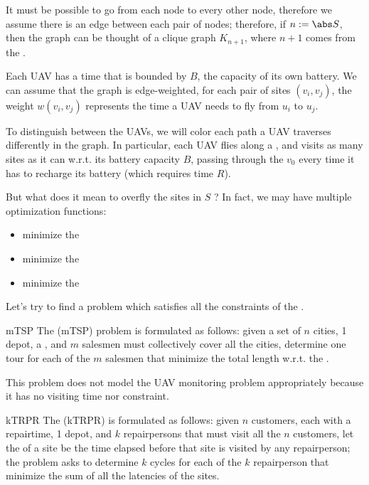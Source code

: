 \documentclass[a4paper, 12pt]{report}
\begin{document}
    It must be possible to go from each node to every other node, therefore we assume there is an edge between each pair of nodes; therefore, if $n := \abs S$, then the graph can be thought of a clique graph $K_{n + 1}$, where $n + 1$ comes from the .

    Each UAV has a  time that is bounded by $B$, the capacity of its own battery. We can assume that the graph is edge-weighted, for each pair of sites $(v_i,v_j)$, the weight $w(v_i, v_j)$ represents the time a UAV needs to fly from $u_i$ to $u_j$.

    To distinguish between the UAVs, we will color each path a UAV traverses differently in the graph. In particular, each UAV flies along a , and visits as many sites as it can w.r.t. its battery capacity $B$, passing through the  $v_0$ every time it has to recharge its battery (which requires time $R$).

    But what does it mean to overfly the sites in $S$ ? In fact, we may have multiple optimization functions:

    \begin{itemize}
        \item minimize the 
        \item minimize the 
        \item minimize the 
    \end{itemize}

    Let's try to find a problem which satisfies all the constraints of the .

    \begin{frameddefn}{mTSP}
        The  (mTSP) problem is formulated as follows: given a set of $n$ cities, 1 depot, a , and $m$ salesmen must collectively cover all the cities, determine one tour for each of the $m$ salesmen that minimize the total length w.r.t. the .
    \end{frameddefn}

    This problem does not model the UAV monitoring problem appropriately because it has no visiting time nor  constraint.

    \begin{frameddefn}{kTRPR}
        The  (kTRPR) is formulated as follows: given $n$ customers, each with a repairtime, 1 depot, and $k$ repairpersons that must visit all the $n$ customers, let the  of a site be the time elapsed before that site is visited by any repairperson; the problem asks to determine $k$ cycles for each of the $k$ repairperson that minimize the sum of all the latencies of the sites.
    \end{frameddefn}
\end{document}
